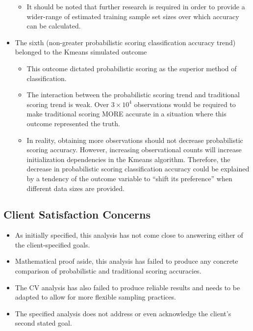 \documentclass[12pt,]{article}
\providecommand{\tightlist}{%
  \setlength{\itemsep}{0pt}\setlength{\parskip}{0pt}}
\begin{document}
\begin{itemize}
  \begin{itemize}
  \tightlist
  \item
    It should be noted that further research is required in order to
    provide a wider-range of estimated training sample set sizes over
    which accuracy can be calculated.
  \end{itemize}
\item
  The sixth (non-greater probabilistic scoring classification accuracy
  trend) belonged to the Kmeans simulated outcome

  \begin{itemize}
  \tightlist
  \item
    This outcome dictated probabilistic scoring as the superior method
    of classification.
  \item
    The interaction between the probabilistic scoring trend and
    traditional scoring trend is weak. Over \(3 \times 10^{4}\)
    observations would be required to make traditional scoring MORE
    accurate in a situation where this outcome represented the truth.
  \item
    In reality, obtaining more observations should not decrease
    probabilistic scoring accuracy. However, increasing observational
    counts will increase initialization dependencies in the Kmeans
    algorithm. Therefore, the decrease in probabilistic scoring
    classification accuracy could be explained by a tendency of the
    outcome variable to ``shift its preference'' when different data
    sizes are provided.
  \end{itemize}
\end{itemize}

\hypertarget{client-satisfaction-concerns}{%
\subsection{Client Satisfaction
Concerns}\label{client-satisfaction-concerns}}

\begin{itemize}
\tightlist
\item
  As initially specified, this analysis has not come close to answering
  either of the client-specified goals.
\item
  Mathematical proof aside, this analysis has failed to produce any
  concrete comparison of probabilistic and traditional scoring
  accuracies.
\item
  The CV analysis has also failed to produce reliable results and needs
  to be adapted to allow for more flexible sampling practices.
\item
  The specified analysis does not address or even acknowledge the
  client's second stated goal.
\end{itemize}
\end{document}
